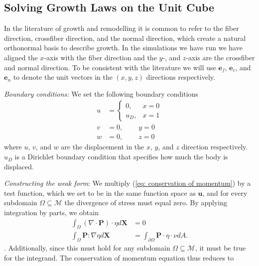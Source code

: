 \subsection{Solving Growth Laws on the Unit Cube}
\label{subsec: experiments}
In the literature of growth and remodelling it is common to refer to the fiber direction, crossfiber direction, and the normal direction, which create a natural orthonormal basis to describe growth. In the simulations we have run we have aligned the $x$-axis with the fiber direction and the $y$-, and $z$-axis are the crossfiber and normal direction. To be consistent with the literature we will use $\mathbf{e}_f$, $\mathbf{e}_c$, and $\mathbf{e}_n$ to denote the unit vectors in the $(x, y, z)$ directions respectively.  \par
\emph{Boundary conditions:} We set the following boundary conditions
\begin{align*}
    u &= \begin{cases}
        0, & x = 0 \\
        u_D, & x = 1
    \end{cases} \\
    v &= 0, \qquad \ y = 0 \\
    w &= 0, \qquad \ z = 0
\end{align*}
where $u$, $v$, and $w$ are the displacement in the $x$, $y$, and $z$ direction respectively. $u_D$ is a Dirichlet boundary condition that specifies how much the body is displaced. 
\par
\emph{Constructing the weak form}: We multiply (\ref{eq: conservation of momentum}) by a test function, which we set to be in the same function space as $\mathbf{u}$, and for every subdomain $\Omega \subseteq \mathcal{M}$ the divergence of stress must equal zero. By applying integration by parts, we obtain
\begin{align*}
    \int_\Omega(\nabla\cdot\mathbf{P})\cdot\eta d\mathbf{X} &= 0 \\
    \int_\Omega \mathbf{P} : \nabla\eta d\mathbf{X} &= \int_{\partial\Omega}\mathbf{P}\cdot\eta \cdot \nu dA.
\end{align*}
. Additionally, since this must hold for any subdomain $\Omega \subseteq \mathcal{M}$, it must be true for the integrand. The conservation of momentum equation thus reduces to
